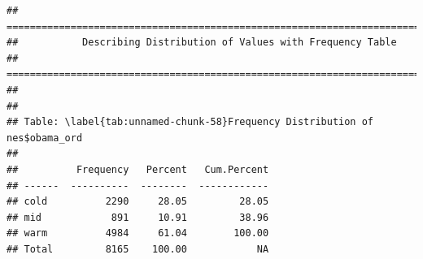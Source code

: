 \documentclass[
]{book}
\newenvironment{Shaded}{\begin{snugshade}}{\end{snugshade}}
\newcommand{\AttributeTok}[1]{\textcolor[rgb]{0.13,0.29,0.53}{#1}}
\newcommand{\CommentTok}[1]{\textcolor[rgb]{0.56,0.35,0.01}{\textit{#1}}}
\newcommand{\DecValTok}[1]{\textcolor[rgb]{0.00,0.00,0.81}{#1}}
\newcommand{\FunctionTok}[1]{\textcolor[rgb]{0.13,0.29,0.53}{\textbf{#1}}}
\newcommand{\NormalTok}[1]{#1}
\newcommand{\OtherTok}[1]{\textcolor[rgb]{0.56,0.35,0.01}{#1}}
\newcommand{\SpecialCharTok}[1]{\textcolor[rgb]{0.81,0.36,0.00}{\textbf{#1}}}
\newcommand{\StringTok}[1]{\textcolor[rgb]{0.31,0.60,0.02}{#1}}
\begin{document}
\begin{Shaded}
\end{Shaded}

\begin{verbatim}
## ===========================================================================
##           Describing Distribution of Values with Frequency Table
## ===========================================================================
## 
## 
## Table: \label{tab:unnamed-chunk-58}Frequency Distribution of nes$obama_ord
## 
##          Frequency   Percent   Cum.Percent
## ------  ----------  --------  ------------
## cold          2290     28.05         28.05
## mid            891     10.91         38.96
## warm          4984     61.04        100.00
## Total         8165    100.00            NA
\end{verbatim}
\end{document}

